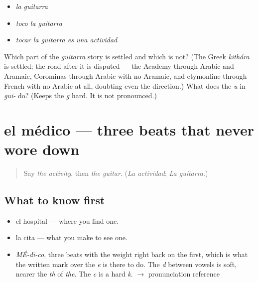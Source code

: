 \begin{itemize}
\raggedright
  \item \emph{la guitarra}
  \item \emph{toco la guitarra}
  \item \emph{tocar la guitarra es una actividad}
\end{itemize}

\begin{tcolorbox}[breakable,colback=teal!4,colframe=teal!35!black,title={Before you move on}]
Which part of the \emph{guitarra} story is settled and which is not? (The Greek \emph{kithára} is settled; the road after it is disputed — the Academy through Arabic and Aramaic, Corominas through Arabic with no Aramaic, and etymonline through French with no Arabic at all, doubting even the direction.) What does the \emph{u} in \emph{gui-} do? (Keeps the \emph{g} hard. It is not pronounced.)
\end{tcolorbox}
\section[el médico]{el médico — three beats that never wore down}

\label{lesson:ES-C394-medico}



\begin{quote}
Say \emph{the activity}, then \emph{the guitar}. (\emph{La actividad}; \emph{La guitarra}.)
\end{quote}

\subsection*{What to know first}
\begin{itemize}
\raggedright
  \item el hospital — where you find one.
  \item la cita — what you make to see one.
\end{itemize}

\begin{sounds}
\begin{itemize}
\raggedright
  \item \emph{MÉ-di-co}, three beats with the weight right back on the first, which is what the written mark over the \emph{e} is there to do. The \emph{d} between vowels is soft, nearer the \emph{th} of \emph{the}. The \emph{c} is a hard \emph{k}. $\to$ pronunciation reference
\end{itemize}
\end{sounds}

